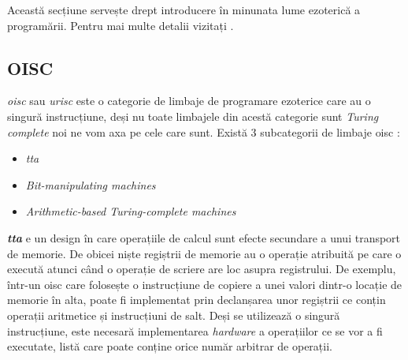 \documentclass[../main.tex]{subfiles}
\begin{document}
Această secțiune servește drept introducere în minunata lume ezoterică a programării. Pentru mai multe detalii
vizitați \cite{esolangs}.

\subsection{OISC}
\emph{\acrfull{oisc}} sau \emph{\acrfull{urisc}} \cite{oisc} este o categorie de limbaje de programare ezoterice 
care au o singură instrucțiune, deși nu toate limbajele din acestă categorie sunt \emph{Turing complete} noi ne
vom axa pe cele care sunt. Există 3 subcategorii de limbaje \acrshort{oisc} \cite{oisc}:
\begin{itemize}
    \item \emph{\acrlong{tta}}
    \item \emph{Bit-manipulating machines}
    \item \emph{Arithmetic-based Turing-complete machines}
\end{itemize}

\emph{\textbf{\acrfull{tta}}} e un design în care operațiile de calcul sunt efecte secundare a unui transport de memorie.
De obicei niște regiștrii de memorie au o operație atribuită pe care o execută atunci când o operație de scriere
are loc asupra registrului. De exemplu, într-un \acrshort{oisc} care folosește o instrucțiune de copiere a unei valori
dintr-o locație de memorie în alta, poate fi implementat prin declanșarea unor regiștrii ce conțin operații aritmetice
și instrucțiuni de salt. Deși se utilizează o singură instrucțiune, este necesară implementarea \emph{hardware} a 
operațiilor ce se vor a fi executate, listă care poate conține orice număr arbitrar de operații.
\end{document}
